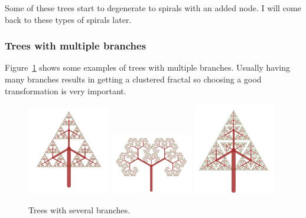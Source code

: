             \FloatBarrier

            Some of these trees start to degenerate to spirals with an added node. 
            I will come back to these types of spirals later.

        \subsubsection{Trees with multiple branches}

            Figure~\ref{simple_tree_03} shows some examples of trees with multiple branches.
            Usually having many branches results in getting a clustered fractal so choosing a good transformation is very important.
            

            \begin{figure}[ht]
                \caption{\label{simple_tree_03} Trees with several branches.}
                \centering
                \includegraphics[width=0.32\textwidth]{img/Simple_Techniques/Trees/tree_08.png}
                \includegraphics[width=0.32\textwidth]{img/Simple_Techniques/Trees/tree_09.png}
                \includegraphics[width=0.32\textwidth]{img/Simple_Techniques/Trees/tree_10.png}             
            \end{figure}

